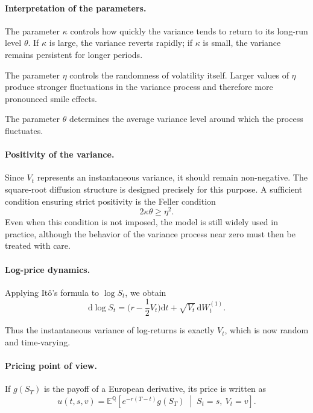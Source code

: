 \documentclass[11pt]{article}
\newcommand{\Qbb}{\mathbb{Q}}
\newcommand{\E}{\mathbb{E}}
\theoremstyle{plain}
\theoremstyle{definition}
\theoremstyle{remark}
\begin{document}
\paragraph{Interpretation of the parameters.}

The parameter \(\kappa\) controls how quickly the variance tends to
return to its long-run level \(\theta\).
If \(\kappa\) is large, the variance reverts rapidly; if \(\kappa\) is
small, the variance remains persistent for longer periods.

The parameter \(\eta\) controls the randomness of volatility itself.
Larger values of \(\eta\) produce stronger fluctuations in the variance
process and therefore more pronounced smile effects.

The parameter \(\theta\) determines the average variance level around
which the process fluctuates.

\paragraph{Positivity of the variance.}

Since \(V_t\) represents an instantaneous variance, it should remain
non-negative.
The square-root diffusion structure is designed precisely for this
purpose.
A sufficient condition ensuring strict positivity is the Feller
condition
\[
2\kappa\theta \ge \eta^2.
\]
Even when this condition is not imposed, the model is still widely used
in practice, although the behavior of the variance process near zero
must then be treated with care.

\paragraph{Log-price dynamics.}

Applying It\^o's formula to \(\log S_t\), we obtain
\[
\mathrm{d}\log S_t
=
\Big(r-\frac12V_t\Big)\mathrm{d}t
+
\sqrt{V_t}\,\mathrm{d}W_t^{(1)}.
\]

Thus the instantaneous variance of log-returns is exactly \(V_t\), which
is now random and time-varying.

\paragraph{Pricing point of view.}

If \(g(S_T)\) is the payoff of a European derivative, its price is
written as
\[
u(t,s,v)
=
\E^\Qbb\!\left[
e^{-r(T-t)}g(S_T)
\;\middle|\;
S_t=s,\ V_t=v
\right].
\]
\end{document}
